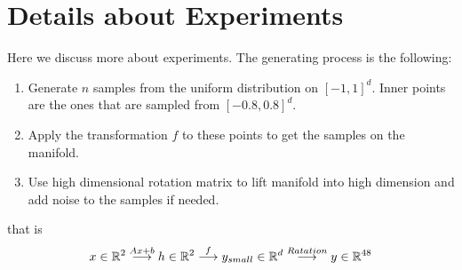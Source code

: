 \section{Details about Experiments}
\label{more_exp}
Here we discuss more about experiments. The generating process is the following:

\begin{enumerate}
    \item Generate $n$ samples from the uniform distribution on $[-1,1]^d$. Inner points are the ones that are sampled from $[-0.8, 0.8]^d$.
    \item Apply the transformation $f$ to these points to get the samples on the manifold.
    \item Use high dimensional rotation matrix to lift manifold into high dimension and add noise to the samples if needed. 
\end{enumerate}
that is
\begin{align}
    x \in \mathbb{R}^2 \overset{Ax + b}{\longrightarrow} h \in \mathbb{R}^2 \overset{f}{\longrightarrow} y_{small} \in \mathbb{R}^d \overset{Ratation}{\longrightarrow} y \in \mathbb{R}^{48}
\end{align}

